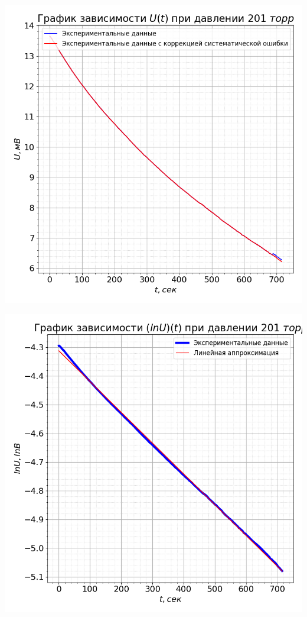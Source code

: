 \documentclass[a4paper, 12pt]{article}
\begin{document}
        \begin{minipage}{0.47\textwidth}
            \includegraphics[width=1\linewidth]{graphs/raw201.png}
        \end{minipage}
        \begin{minipage}{0.47\textwidth}
            \includegraphics[width=1\linewidth]{graphs/log201.png}
        \end{minipage}
\end{document}
